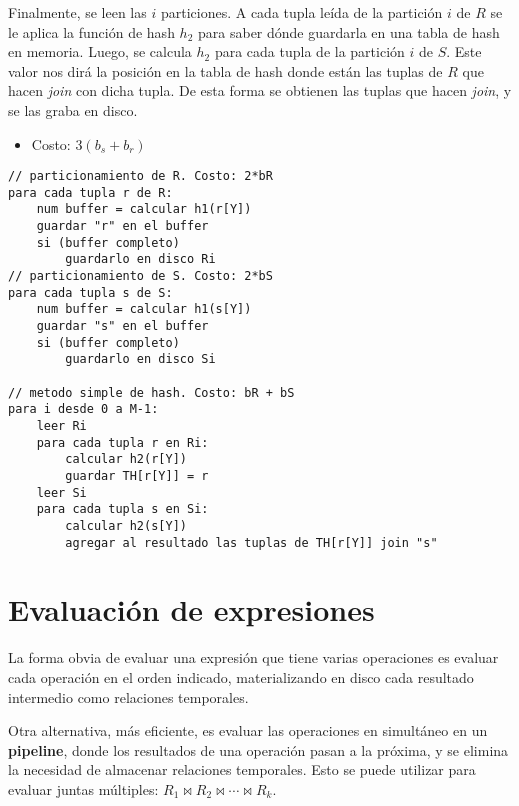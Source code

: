 \documentclass[a4paper, twoside]{article}
\begin{document}
\begin{itemize}
Finalmente, se leen las $i$ particiones. A cada tupla leída de la
partición $i$ de $R$ se le aplica la función de hash $h_{2}$ para
saber dónde guardarla en una tabla de hash en memoria. Luego, se calcula
$h_{2}$ para cada tupla de la partición $i$ de $S$. Este valor
nos dirá la posición en la tabla de hash donde están las tuplas de
$R$ que hacen \emph{join} con dicha tupla. De esta forma se obtienen
las tuplas que hacen \emph{join}, y se las graba en disco.
\begin{itemize}
\item Costo: $3\left(b_{s}+b_{r}\right)$
\end{itemize}

\begin{lstlisting}
// particionamiento de R. Costo: 2*bR
para cada tupla r de R:
	num buffer = calcular h1(r[Y])
	guardar "r" en el buffer
	si (buffer completo)
		guardarlo en disco Ri
// particionamiento de S. Costo: 2*bS
para cada tupla s de S:
	num buffer = calcular h1(s[Y])
	guardar "s" en el buffer
	si (buffer completo)
		guardarlo en disco Si

// metodo simple de hash. Costo: bR + bS
para i desde 0 a M-1:
	leer Ri
	para cada tupla r en Ri:
		calcular h2(r[Y])
		guardar TH[r[Y]] = r
	leer Si
	para cada tupla s en Si:
		calcular h2(s[Y])
		agregar al resultado las tuplas de TH[r[Y]] join "s"
\end{lstlisting}


\end{itemize}

\section{Evaluación de expresiones}

La forma obvia de evaluar una expresión que tiene varias operaciones
es evaluar cada operación en el orden indicado, materializando en
disco cada resultado intermedio como relaciones temporales.

Otra alternativa, más eficiente, es evaluar las operaciones en simultáneo
en un \textbf{pipeline}, donde los resultados de una operación pasan
a la próxima, y se elimina la necesidad de almacenar relaciones temporales.
Esto se puede utilizar para evaluar juntas múltiples: $R_{1}\bowtie R_{2}\bowtie\cdots\bowtie R_{k}$.
\end{document}
